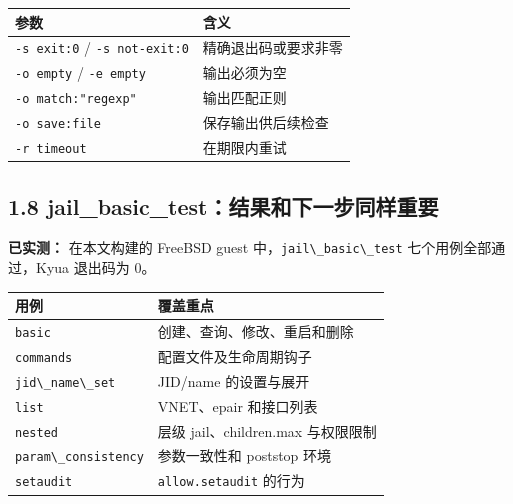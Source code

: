 \documentclass[
  11pt,
  UTF8,
  a4paper,
  fontset=fandol]{ctexart}
\newcommand{\passthrough}[1]{#1}
\begin{document}
\begin{longtable}[]{@{}
  >{\raggedright\arraybackslash}p{}
  >{\raggedright\arraybackslash}p{}@{}}
\toprule\noalign{}
\begin{minipage}[b]{\linewidth}\raggedright
参数
\end{minipage} & \begin{minipage}[b]{\linewidth}\raggedright
含义
\end{minipage} \\
\midrule\noalign{}
\endhead
\bottomrule\noalign{}
\endlastfoot
\passthrough{\lstinline!-s exit:0!} /
\passthrough{\lstinline!-s not-exit:0!} & 精确退出码或要求非零 \\
\passthrough{\lstinline!-o empty!} / \passthrough{\lstinline!-e empty!}
& 输出必须为空 \\
\passthrough{\lstinline!-o match:"regexp"!} & 输出匹配正则 \\
\passthrough{\lstinline!-o save:file!} & 保存输出供后续检查 \\
\passthrough{\lstinline!-r timeout!} & 在期限内重试 \\
\end{longtable}

\subsection{1.8
jail\_basic\_test：结果和下一步同样重要}\label{jail_basic_testux7ed3ux679cux548cux4e0bux4e00ux6b65ux540cux6837ux91cdux8981}

\textbf{已实测：} 在本文构建的 FreeBSD guest
中，\passthrough{\lstinline!jail\_basic\_test!} 七个用例全部通过，Kyua
退出码为 0。

\begin{longtable}[]{@{}
  >{\raggedright\arraybackslash}p{}
  >{\raggedright\arraybackslash}p{}@{}}
\toprule\noalign{}
\begin{minipage}[b]{\linewidth}\raggedright
用例
\end{minipage} & \begin{minipage}[b]{\linewidth}\raggedright
覆盖重点
\end{minipage} \\
\midrule\noalign{}
\endhead
\bottomrule\noalign{}
\endlastfoot
\passthrough{\lstinline!basic!} & 创建、查询、修改、重启和删除 \\
\passthrough{\lstinline!commands!} & 配置文件及生命周期钩子 \\
\passthrough{\lstinline!jid\_name\_set!} & JID/name 的设置与展开 \\
\passthrough{\lstinline!list!} & VNET、epair 和接口列表 \\
\passthrough{\lstinline!nested!} & 层级 jail、children.max 与权限限制 \\
\passthrough{\lstinline!param\_consistency!} & 参数一致性和 poststop
环境 \\
\passthrough{\lstinline!setaudit!} &
\passthrough{\lstinline!allow.setaudit!} 的行为 \\
\end{longtable}
\end{document}
